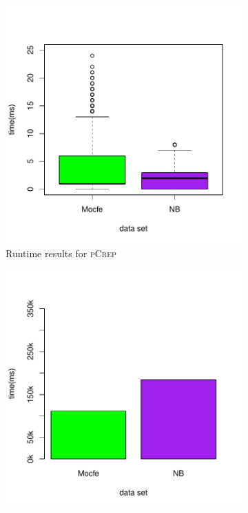 \documentclass[a4paper,UKenglish,cleveref, autoref, thm-restate,authorcolumns]{../lipics/lipics-v2019}
\newcommand{\adjDel}{\textsc{pCrep}}
\begin{document}
\begin{figure}
	\centering
	\begin{minipage}{0.48\linewidth}
		\begin{subfigure}[b]{\linewidth}			\includegraphics*[width=\linewidth]{new_time_hpc_filtered_decompTree}
			\caption{Runtime results for \adjDel}
		\end{subfigure}		
	\end{minipage}
	\begin{minipage}{0.48\linewidth}
		\begin{subfigure}[b]{\linewidth}
			\includegraphics*[width=\linewidth]{new_barplot_time_hpc_filtered_decompTree}

\end{subfigure}
\end{minipage}
\end{figure}
\end{document}
